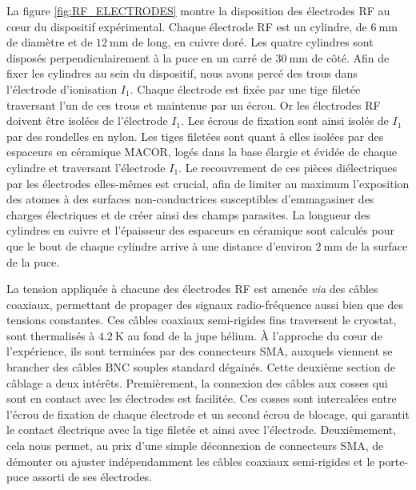\noindent La figure \ref{fig:RF_ELECTRODES} montre la disposition des électrodes RF au c\oe ur du dispositif expérimental.
Chaque électrode RF est un cylindre, de $\SI{6}{\mm}$ de diamètre et de $\SI{12}{\mm}$ de long, en cuivre doré.
Les quatre cylindres sont disposés perpendiculairement à la puce en un carré de $\SI{30}{\mm}$ de côté.
Afin de fixer les cylindres au sein du dispositif, nous avons percé des trous dans l'électrode d'ionisation $I_1$.
Chaque électrode est fixée par une tige filetée traversant l'un de ces trous et maintenue par un écrou.
Or les électrodes RF doivent être isolées de l'électrode $I_1$.
Les écrous de fixation sont ainsi isolés de $I_1$ par des rondelles en nylon.
Les tiges filetées sont quant à elles isolées par des espaceurs en céramique MACOR, logés dans la base élargie et évidée de chaque cylindre et traversant l'électrode $I_1$.
Le recouvrement de ces pièces diélectriques par les électrodes elles-mêmes est crucial, afin de limiter au maximum l'exposition des atomes à des surfaces non-conductrices susceptibles d'emmagasiner des charges électriques et de créer ainsi des champs parasites.
La longueur des cylindres en cuivre et l'épaisseur des espaceurs en céramique sont calculés pour que le bout de chaque cylindre arrive à une distance d'environ $\SI{2}{\mm}$ de la surface de la puce.

La tension appliquée à chacune des électrodes RF est amenée \textit{via} des câbles coaxiaux,  permettant de propager des signaux radio-fréquence aussi bien que des tensions constantes.
Ces câbles coaxiaux semi-rigides fins traversent le cryostat, sont thermalisés à $\SI{4.2}{\K}$ au fond de la jupe hélium.
\`A l'approche du c\oe ur de l'expérience, ils sont terminées par des connecteurs SMA, auxquels viennent se brancher des câbles BNC souples standard dégainés. %
Cette deuxième section de câblage a deux intérêts.
Premièrement, la connexion des câbles aux cosses qui sont en contact avec les électrodes est facilitée. %
Ces cosses sont intercalées entre l'écrou de fixation de chaque électrode et un second écrou de blocage, qui garantit le contact électrique avec la tige filetée et ainsi avec l'électrode.
Deuxièmement, cela nous permet, au prix d'une simple déconnexion de connecteurs SMA, de démonter ou ajuster indépendamment les câbles coaxiaux semi-rigides et le porte-puce assorti de ses électrodes.

